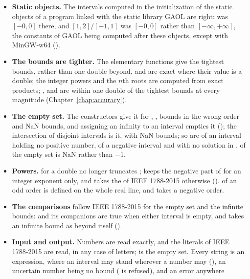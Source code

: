 \documentclass[12pt,a4paper,twoside,openright]{book}
\begin{document}
\begin{itemize}
\item[$\bullet$] \textbf{Static objects.} The intervals computed in the
  initialization of the static objects of a program linked with the static
  library GAOL are right:  was $[-0, 0]$ there, and
  $[1, 2]/[-1, 1]$ was $[-0, 0]$ rather than $[-\infty, +\infty]$, the
  constants of GAOL being computed after these objects, except with MinGW-w64
  ().
\item[$\bullet$] \textbf{The bounds are tighter.} The elementary functions
  give the tightest bounds, rather than one double beyond, and are exact
  where their value is a double; the integer powers and the $n$th roots are
  computed from exact products; ,  and  are
  within one double of the tightest bounds at every magnitude
  (Chapter~\ref{chap:accuracy}).
\item[$\bullet$] \textbf{The empty set.} The constructors give it for
  \itv{+\infty}{+\infty}, \itv{-\infty}{-\infty}, bounds in the wrong order
  and NaN bounds, and assigning an infinity to an interval empties it
  (); the intersection of disjoint intervals is it,
  with NaN bounds; so are  of an interval holding no positive
  number,  of a negative interval and  with
  no solution in .  of the empty set is NaN rather than
  $-1$.
\item[$\bullet$] \textbf{Powers.}  for a double  no
  longer truncates ;  keeps the negative part of
   for an integer exponent only, and takes the  of IEEE
  1788-2015 otherwise ().  of an odd order
  is defined on the whole real line, and takes a negative order.
\item[$\bullet$] \textbf{The comparisons} follow IEEE 1788-2015 for the empty
  set and the infinite bounds:  and its companions are
  true when either interval is empty, and 
  takes an infinite bound as beyond itself ().
\item[$\bullet$] \textbf{Input and output.} Numbers are read exactly, and the
  literals of IEEE 1788-2015 are read, in any case of letters;
   is the empty set. Every string is an expression, where an
  interval may stand wherever a number may (), an uncertain
  number being no bound ( is refused), and an error anywhere

\end{itemize}
\end{document}
